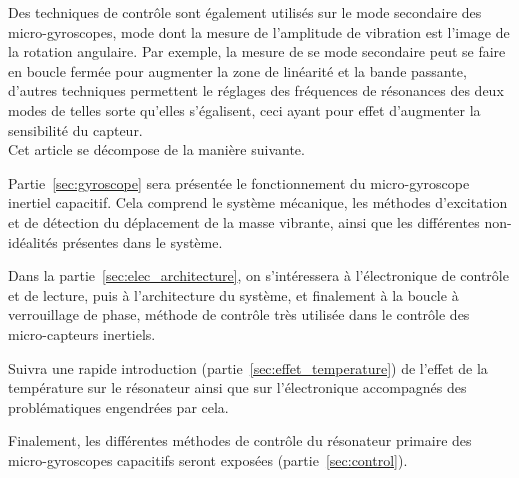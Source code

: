 Des techniques de contrôle sont également utilisés sur le mode secondaire des micro-gyroscopes, mode dont la mesure de l'amplitude de vibration est l'image de la rotation angulaire. Par exemple, la mesure de se mode secondaire peut se faire en boucle fermée pour augmenter la zone de linéarité et la bande passante, d'autres techniques permettent le réglages des fréquences de résonances des deux modes de telles sorte qu'elles s'égalisent, ceci ayant pour effet d'augmenter la sensibilité du capteur.\\

Cet article se décompose de la manière suivante.

Partie~\ref{sec:gyroscope} sera présentée le fonctionnement du micro-gyroscope inertiel capacitif. Cela comprend le système mécanique, les méthodes d'excitation et de détection du déplacement de la masse vibrante, ainsi que les différentes non-idéalités présentes dans le système.

Dans la partie~\ref{sec:elec_architecture}, on s'intéressera à l'électronique de contrôle et de lecture, puis à l'architecture du système, et finalement à la boucle à verrouillage de phase, méthode de contrôle très utilisée dans le contrôle des micro-capteurs inertiels.

Suivra une rapide introduction (partie~\ref{sec:effet_temperature}) de l'effet de la température sur le résonateur ainsi que sur l'électronique accompagnés des problématiques engendrées par cela.

Finalement, les différentes méthodes de contrôle du résonateur primaire des micro-gyroscopes capacitifs seront exposées (partie~\ref{sec:control}).


